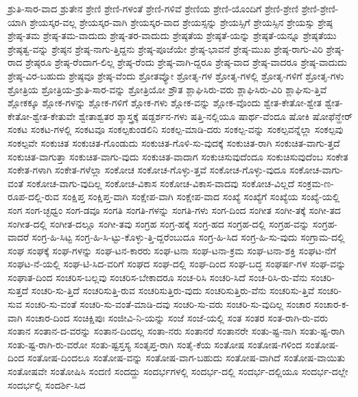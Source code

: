 {ಶ್ರುತಿ-ಸಾರ-ವಾದ
ಶ್ರುತೇನ
ಶ್ರೇಣಿ
ಶ್ರೇಣಿ-ಗಳಂತೆ
ಶ್ರೇಣಿ-ಗಳಿವೆ
ಶ್ರೇಣಿಯ
ಶ್ರೇಣಿ-ಯೊಂದಿಗೆ
ಶ್ರೇಣಿ-ಶ್ರೇಣಿ
ಶ್ರೇಣಿ-ಶ್ರೇಣಿ-ಯಾಗಿ
ಶ್ರೇಯಸ್ಕರ-ವಲ್ಲ
ಶ್ರೇಯಸ್ಕರ-ವಾಗಿ
ಶ್ರೇಯಸ್ಕರ-ವಾದ
ಶ್ರೇಯಸ್ಸನ್ನು
ಶ್ರೇಯಸ್ಸಿಗೆ
ಶ್ರೇಯಸ್ಸಿನ
ಶ್ರೇಯಸ್ಸು
ಶ್ರೇಷ್ಠ
ಶ್ರೇಷ್ಠ-ತಮ
ಶ್ರೇಷ್ಠ-ತಮ-ವಾದುದು
ಶ್ರೇಷ್ಠ-ತರ-ವಾದುದು
ಶ್ರೇಷ್ಠತೆಯ
ಶ್ರೇಷ್ಠತೆ-ಯನ್ನು
ಶ್ರೇಷ್ಠತೆ-ಯನ್ನೂ
ಶ್ರೇಷ್ಠತೆಯು
ಶ್ರೇಷ್ಠತ್ವ-ವನ್ನು
ಶ್ರೇಷ್ಠನ
ಶ್ರೇಷ್ಠ-ನಾಗು-ತ್ತಿದ್ದನು
ಶ್ರೇಷ್ಠ-ಪೂಜೆಯೇ
ಶ್ರೇಷ್ಠ-ಭಾವನೆ
ಶ್ರೇಷ್ಠ-ಮುಖ
ಶ್ರೇಷ್ಠ-ರಾಗು-ವಿರಿ
ಶ್ರೇಷ್ಠ-ರಾದ
ಶ್ರೇಷ್ಠರೂ
ಶ್ರೇಷ್ಠ-ರೆಂದಾಗ-ಲಿಲ್ಲ
ಶ್ರೇಷ್ಠ-ರೆಂದು
ಶ್ರೇಷ್ಠ-ವಾಗಿ-ದ್ದರೂ
ಶ್ರೇಷ್ಠ-ವಾದ
ಶ್ರೇಷ್ಠ-ವಾದರೂ
ಶ್ರೇಷ್ಠ-ವಾದುದು
ಶ್ರೇಷ್ಠ-ವಿರ-ಬಹುದು
ಶ್ರೇಷ್ಠವೂ
ಶ್ರೇಷ್ಠ-ವೆಂದು
ಶ್ರೋತವ್ಯೋ
ಶ್ರೋತೃ-ಗಳ
ಶ್ರೋತೃ-ಗಳಲ್ಲಿ
ಶ್ರೋತೃ-ಗಳಿಗೆ
ಶ್ರೋತೃ-ಗಳು
ಶ್ರೋತ್ರಿಯ
ಶ್ರೋತ್ರಿಯ-ಶ್ರುತಿ-ಸಾರ-ವನ್ನು
ಶ್ರೋತ್ರಿಯೋ
ಶ್ರೌತ
ಶ್ಲಾಘಿಸಿರು-ವರು
ಶ್ಲಾಘಿಸಿರು-ವಿರಿ
ಶ್ಲಾಘಿಸು-ತ್ತಿವೆ
ಶ್ಲೋಕಕ್ಕೂ
ಶ್ಲೋಕ-ಗಳನ್ನು
ಶ್ಲೋಕ-ಗಳಿಗೆ
ಶ್ಲೋಕ-ಗಳು
ಶ್ಲೋಕ-ವನ್ನು
ಶ್ಲೋಕ-ವೊಂದು
ಶ್ವೇತ-ಕೇತೋ-ಶ್ವೇತ
ಶ್ವೇತ-ಕೇತೋ-ಶ್ವೇತ-ಕೇತುವೇ
ಶ್ವೇತಾಶ್ವತರ
ಶ್ಶಾಸ್ತ್ರಕ್ಕೆ
ಷಡ್ದರ್ಶನ-ಗಳು
ಷತ್ತಿ-ನಲ್ಲಿಯೂ
ಷಾರ್ಥ-ವೆಂದೂ
ಷೋಕಿ
ಷೋಫೆನ್ಹೇರ್
ಸಂಕಟ
ಸಂಕಟ-ಗಳಲ್ಲಿ
ಸಂಕಟವೂ
ಸಂಕಲ್ಪಕುಂಡಲಿನಿ
ಸಂಕಲ್ಪ-ಮಾಡಿ-ದರು
ಸಂಕಲ್ಪ-ವನ್ನು
ಸಂಕಲ್ಪವನ್ನೆಲ್ಲಾ
ಸಂಕಲ್ಪವು
ಸಂಕಲ್ಪವೇ
ಸಂಕುಚಿತ
ಸಂಕುಚಿತ-ಗೊಂಡುದು
ಸಂಕುಚಿತ-ಗೊಳಿ-ಸು-ವುದಕ್ಕೆ
ಸಂಕುಚಿತ-ರಾಗಿ
ಸಂಕುಚಿತ-ವಾಗು-ತ್ತದೆ
ಸಂಕುಚಿತ-ವಾಗುತ್ತಾ
ಸಂಕುಚಿತ-ವಾಗು-ವುದು
ಸಂಕುಚಿತ-ವಾದಾಗ
ಸಂಕುಚಿಸುವುದೆಂದೂ
ಸಂಕುಚಿಸುವುದೆಂಬ
ಸಂಕೇತ
ಸಂಕೇತ-ಗಳಾಗಿ
ಸಂಕೇತ-ಗಳೆಲ್ಲಾ
ಸಂಕೋಚ
ಸಂಕೋಚ-ಗೊಳ್ಳು-ತ್ತವೆ
ಸಂಕೋಚ-ಗೊಳ್ಳು-ವುದೂ
ಸಂಕೋಚ-ವಾಗು-ವಂತೆ
ಸಂಕೋಚ-ವಾಗು-ವುದಿಲ್ಲ
ಸಂಕೋಚ-ವಿಕಾಸ
ಸಂಕೋಚ-ವಿಕಾಸ-ವಾದವು
ಸಂಕೋಚ-ವಿಲ್ಲದೆ
ಸಂಕ್ರಮ-ಣ-ರೂಪ-ದಲ್ಲಿ-ರುವ
ಸಂಕ್ಷಿಪ್ತ
ಸಂಕ್ಷಿಪ್ತ-ವಾಗಿ
ಸಂಕ್ಷೇಪ-ವಾಗಿ
ಸಂಕ್ಷೇಪ-ವಾದ
ಸಂಖ್ಯೆ
ಸಂಖ್ಯೆಗೆ
ಸಂಖ್ಯೆಯ
ಸಂಖ್ಯೆ-ಯಲ್ಲಿ
ಸಂಗ
ಸಂಗ-ಚ್ಛಧ್ವಂ
ಸಂಗ-ಡವೂ
ಸಂಗತಿ
ಸಂಗತಿ-ಗಳನ್ನು
ಸಂಗತಿ-ಗಳು
ಸಂಗ-ದಿಂದ
ಸಂಗೀತ
ಸಂಗೀ-ತಕ್ಕೆ
ಸಂಗೀ-ತದ
ಸಂಗೀತ-ದಲ್ಲಿ
ಸಂಗೀತ-ದಲ್ಲೂ
ಸಂಗೀ-ತವು
ಸಂಗ್ರಹ
ಸಂಗ್ರ-ಹಕ್ಕೆ
ಸಂಗ್ರ-ಹದ
ಸಂಗ್ರಹ-ದಲ್ಲಿ
ಸಂಗ್ರಹ-ವನ್ನು
ಸಂಗ್ರಹ-ವಾದರೆ
ಸಂಗ್ರ-ಹಿ-ಸಿಟ್ಟ
ಸಂಗ್ರ-ಹಿ-ಸಿ-ಟ್ಟು-ಕೊಳ್ಳು-ತ್ತಿ-ದ್ದರೆಂಬುದೂ
ಸಂಗ್ರ-ಹಿ-ಸಿದ
ಸಂಗ್ರ-ಹಿ-ಸು-ವುದು
ಸಂಗ್ರಾಮ-ದಲ್ಲಿ
ಸಂಘ
ಸಂಘಕ್ಕೆ
ಸಂಘ-ಗಳನ್ನು
ಸಂಘ-ಟನ-ಕಾರರು
ಸಂಘ-ಟನಾ
ಸಂಘ-ಟನಾ-ಕ್ರಮ
ಸಂಘ-ಟನಾ-ಶಕ್ತಿ
ಸಂಘಟ-ನೆಗೆ
ಸಂಘಟ-ನೆ-ಯಲ್ಲಿ
ಸಂಘ-ಟಿ-ಸಿದ-ವರಿಗೆ
ಸಂಘದ
ಸಂಘ-ದಲ್ಲಿ
ಸಂಘ-ದಿಂದ
ಸಂಘ-ಬದ್ಧ
ಸಂಘರ್ಷ-ಗಳ
ಸಂಘ-ವನ್ನು
ಸಂಘಾತ-ದಿಂದ
ಸಂಚರಿಸ-ಬಲ್ಲವು
ಸಂಚರಿಸ-ಬೇಕಾದರೂ
ಸಂಚ-ರಿಸಿ
ಸಂಚರಿ-ಸಿದೆ
ಸಂಚ-ರಿಸಿ-ರು-ವೆನು
ಸಂಚರಿ-ಸುತ್ತದೆ
ಸಂಚರಿ-ಸು-ತ್ತಿದೆ
ಸಂಚರಿಸುತ್ತಿ-ರುವ
ಸಂಚರಿಸುತ್ತಿರು-ವುದು
ಸಂಚರಿಸುತ್ತಿರು-ವೆನು
ಸಂಚರಿಸು-ತ್ತಿವೆ
ಸಂಚರಿ-ಸುವ
ಸಂಚರಿ-ಸು-ವಂತೆ
ಸಂಚರಿ-ಸು-ವಂತೆ-ಮಾಡಿ-ದವು
ಸಂಚರಿ-ಸು-ವರು
ಸಂಚರಿ-ಸು-ವುದಿಲ್ಲ
ಸಂಚಾರ
ಸಂಚಾರ-ಕ-ವಾಗಿ
ಸಂಚಾರ-ದಿಂದ
ಸಂಚಿಕ್ಷಿಪುಃ
ಸಂಜೀವಿ-ನಿ-ಯನ್ನು
ಸಂಜೆ
ಸಂಜೆ-ಯಲ್ಲಿ
ಸಂತ
ಸಂತರ
ಸಂತ-ರಾಗಿ-ರು-ವರು
ಸಂತಾನ
ಸಂತಾನ-ದ-ವರನ್ನು
ಸಂತಾನ-ದಿಂದಲ್ಲ
ಸಂತಾ-ನರು
ಸಂತಾನರೆ
ಸಂತಾನರೇ
ಸಂತು-ಷ್ಟ-ನಾಗಿ
ಸಂತು-ಷ್ಟ-ರಾಗಿ
ಸಂತು-ಷ್ಟ-ರಾಗಿ-ರು-ವರೋ
ಸಂತು-ಷ್ಟಸ್ತಸ್ಯ
ಸಂತೃಪ್ತ-ರಾಗಿ
ಸಂತೈ-ಕೆಯ
ಸಂತೋಷ
ಸಂತೋಷ-ಗಳಿಂದ
ಸಂತೋಷ-ದಿಂದ
ಸಂತೋಷ-ದಿಂದಲೂ
ಸಂತೋಷ-ವನ್ನು
ಸಂತೋಷ-ವಾಗ-ಬಹುದು
ಸಂತೋಷ-ವಾಗಿದೆ
ಸಂತೋಷ-ವಾಯಿತು
ಸಂತೋಷವೇ
ಸಂತೋಷಿಸಿ
ಸಂದಣಿ
ಸಂದದ್ದು
ಸಂದರ್ಭಗಳಲ್ಲಿ
ಸಂದರ್ಭ-ದಲ್ಲಿ
ಸಂದರ್ಭ-ದಲ್ಲಿಯೂ
ಸಂದರ್ಭ-ದಲ್ಲೇ
ಸಂದರ್ಭಲ್ಲಿ
ಸಂದರ್ಶಿ-ಸಿದ
}
